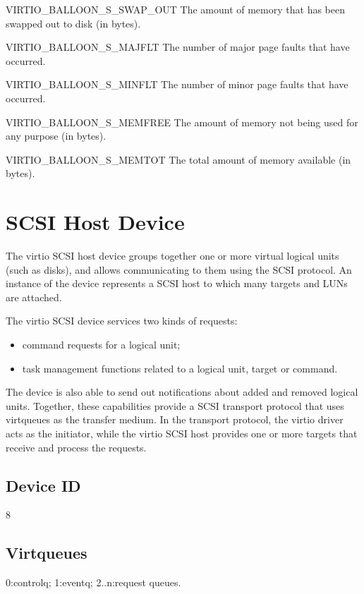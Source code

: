   VIRTIO_BALLOON_S_SWAP_OUT The amount of memory that has been
  swapped out to disk (in bytes).

  VIRTIO_BALLOON_S_MAJFLT The number of major page faults that
  have occurred.

  VIRTIO_BALLOON_S_MINFLT The number of minor page faults that
  have occurred.

  VIRTIO_BALLOON_S_MEMFREE The amount of memory not being used
  for any purpose (in bytes).

  VIRTIO_BALLOON_S_MEMTOT The total amount of memory available
  (in bytes).


\section{SCSI Host Device}\label{sec:Device Types / SCSI Host Device}

The virtio SCSI host device groups together one or more virtual
logical units (such as disks), and allows communicating to them
using the SCSI protocol. An instance of the device represents a
SCSI host to which many targets and LUNs are attached.

The virtio SCSI device services two kinds of requests:

\begin{itemize}
\item command requests for a logical unit;

\item task management functions related to a logical unit, target or
  command.
\end{itemize}

The device is also able to send out notifications about added and
removed logical units. Together, these capabilities provide a
SCSI transport protocol that uses virtqueues as the transfer
medium. In the transport protocol, the virtio driver acts as the
initiator, while the virtio SCSI host provides one or more
targets that receive and process the requests.

\subsection{Device ID}\label{sec:Device Types / SCSI Host Device / Device ID}
  8

\subsection{Virtqueues}\label{sec:Device Types / SCSI Host Device / Virtqueues}
   0:controlq; 1:eventq; 2..n:request queues.

